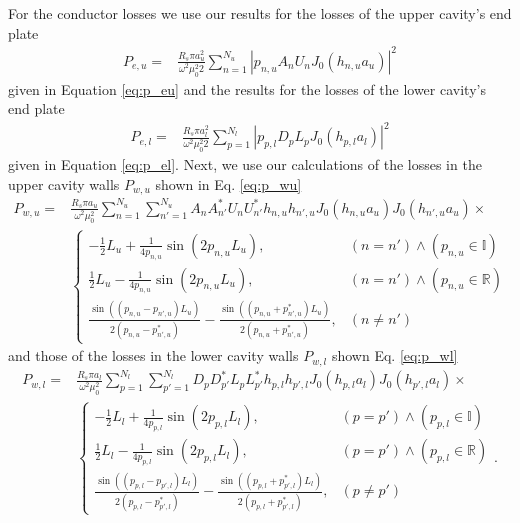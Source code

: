 For the conductor losses we use our results for the losses of the upper cavity's end plate
\begin{align}
P_{e,u}=& \frac{R_s\pi a_u^2}{\omega^2 \mu_0^2 2}\sum\limits_{n=1}^{N_u}|p_{n,u}A_nU_nJ_0(h_{n,u}a_u)|^2
\end{align}
given in Equation \eqref{eq:p_eu} and the results for the losses of the lower cavity's end plate
\begin{align}
P_{e,l}=& \frac{R_s\pi a_l^2}{\omega^2 \mu_0^2 2}\sum\limits_{p=1}^{N_l}|p_{p,l}D_pL_pJ_0(h_{p,l}a_l)|^2
\end{align}
given in Equation \eqref{eq:p_el}. Next, we use our calculations of the losses in the upper cavity walls $P_{w,u}$ shown in Eq. \eqref{eq:p_wu} 
\begin{align}
P_{w,u}=& \frac{R_s\pi a_u}{\omega^2\mu_0^2}\sum\limits_{n=1}^{N_u}\sum\limits_{n'=1}^{N_u}A_nA_{n'}^*U_nU_{n'}^*h_{n,u}h_{n',u}J_0(h_{n,u}a_u)J_0(h_{n',u}a_u)\times\nonumber\\&
       \begin{cases}
        	-\frac{1}{2}L_u+\frac{1}{4p_{n,u}}\sin(2p_{n,u}L_u), &(n=n') \wedge (p_{n,u}\in\mathbb{I})\\
        	 \frac{1}{2}L_u-\frac{1}{4p_{n,u}}\sin(2p_{n,u}L_u), &(n=n')  \wedge  (p_{n,u}\in\mathbb{R})\\
        	 \frac{\sin\left(\left(p_{n,u}-p_{n',u}\right)L_u\right)}{2\left(p_{n,u}-p_{n',u}^*\right)}-\frac{\sin\left(\left(p_{n,u}+p_{n',u}^*\right)L_u\right)}{2\left(p_{n,u}+p_{n',u}^*\right)}, &(n\neq n')
       \end{cases}
\end{align}
and those of the losses in the lower cavity walls $P_{w,l}$ shown Eq. \eqref{eq:p_wl} 
\begin{align}
P_{w,l}=& \frac{R_s\pi a_l}{\omega^2\mu_0^2}\sum\limits_{p=1}^{N_l}\sum\limits_{p'=1}^{N_l}D_pD_{p'}^*L_pL_{p'}^*h_{p,l}h_{p',l}J_0(h_{p,l}a_l)J_0(h_{p',l}a_l)\times\nonumber\\&
       \begin{cases}
        	-\frac{1}{2}L_l+\frac{1}{4p_{p,l}}\sin(2p_{p,l}L_l), &(p=p') \wedge (p_{p,l}\in\mathbb{I})\\
        	 \frac{1}{2}L_l-\frac{1}{4p_{p,l}}\sin(2p_{p,l}L_l), &(p=p')  \wedge  (p_{p,l}\in\mathbb{R})\\
        	 \frac{\sin\left(\left(p_{p,l}-p_{p',l}\right)L_l\right)}{2\left(p_{p,l}-p_{p',l}^*\right)}-\frac{\sin\left(\left(p_{p,l}+p_{p',l}^*\right)L_l\right)}{2\left(p_{p,l}+p_{p',l}^*\right)}, &(p\neq p')
       \end{cases}\text{.}
\end{align}
